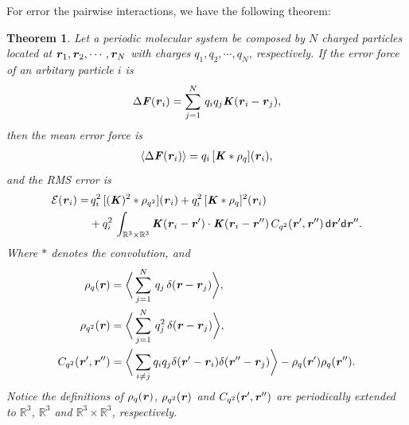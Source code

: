 \documentclass[aps,pre,preprint]{revtex4}
\renewcommand{\v}[1]{\textbf{\textit{#1}}}
\renewcommand{\d}[1]{\textsf{#1}}
\newtheorem{theorem}{Theorem}[section]
\begin{document}
For error the pairwise interactions, we have the following theorem:
\begin{theorem}\label{thm:tmp1}
  Let a periodic molecular system be composed by $N$ charged particles
  located at $\v r_1, \v r_2, \cdots, \v r_N$ with charges $q_1, q_2,
  \cdots, q_N$, respectively.
  If the error force of an arbitary particle $i$ is
  \begin{align}\label{eqn:tmp10}
    \Delta \v F(\v r_i) =
    \sum_{j=1}^N\,q_iq_j \v K(\v r_i - \v r_j),
  \end{align}
  then the mean error force is
  \begin{align}\label{eqn:tmp11}
    \langle\Delta\v F(\v r_i)\rangle
    =q_i\, [\v K\ast\rho_q](\v r_i),
  \end{align}
  and the RMS error is
  \begin{align}\nonumber
    \mathcal E (\v r_i) 
    = &\,
    q_i^2\,[(\v K)^2\ast\rho_{q^2}] (\v r_i) + 
    q_i^2\,[\v K\ast\rho_{q}]^2 (\v r_i) \\\label{eqn:tmp12}
    &+
    q_i^2\,\int_{\mathbb R^3\times\mathbb R^3}
    \v K(\v r_i-\v r')\cdot
    \v K(\v r_i-\v r'')\,
    C_{q^2}(\v r', \v r'')\,
    \d d\v r'\d d\v r''.
  \end{align}
  Where $\ast$ denotes the convolution, and
  \begin{align}\label{eqn:tmp13}
    \rho_q(\v r)
    &= 
    \bigg\langle
    \sum_{j = 1}^N
    \,q_j\,\delta(\v r - \v r_j)
    \bigg\rangle,\\\label{eqn:tmp14}
    \rho_{q^2}(\v r)
    &= 
    \bigg\langle
    \sum_{j = 1}^N
    \,q^2_j\,\delta(\v r - \v r_j)
    \bigg\rangle,\\\label{eqn:tmp15}
    C_{q^2}(\v r', \v r'')
    &=
    \bigg\langle
    \sum_{i\neq j}
    q_iq_j\delta(\v r'-\v r_i)\delta(\v r''-\v r_j)
    \bigg\rangle
    - \rho_q(\v r')\rho_q(\v r'').
  \end{align}
  Notice the definitions of $\rho_q(\v r)$, $\rho_{q^2}(\v r)$ and
  $C_{q^2}(\v r', \v r'')$ are periodically extended to
  $\mathbb{R}^3$, $\mathbb{R}^3$ and $\mathbb{R}^3\times\mathbb R^3$,
  respectively.
\end{theorem}
\end{document}
